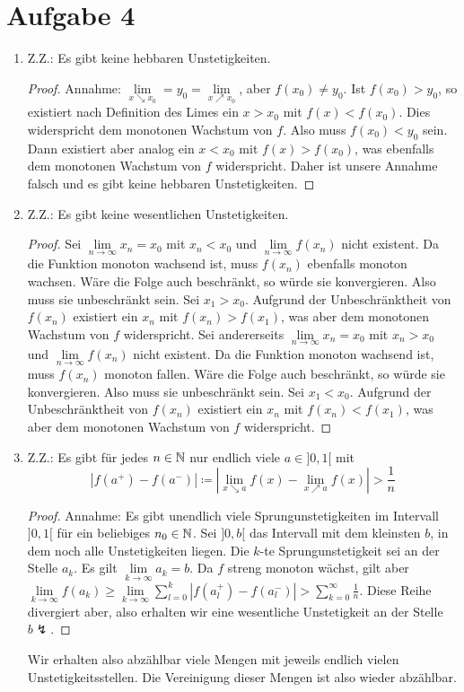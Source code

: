 \documentclass{article}
\newcommand{\mylim}{\lim\limits_{n\to \infty}}
\begin{document}
    \section*{Aufgabe 4}
    \begin{enumerate}
        \item Z.Z.: Es gibt keine hebbaren Unstetigkeiten.
        \begin{proof}
            Annahme: $\lim\limits_{x \searrow x_0} = y_0 = \lim\limits_{x \nearrow x_0}$, aber $f(x_0) \neq y_0$. Ist $f(x_0) > y_0$, so existiert nach Definition des Limes ein $x > x_0$ mit $f(x) < f(x_0)$. Dies widerspricht dem monotonen Wachstum von $f$. Also muss $f(x_0) < y_0$ sein. Dann existiert aber analog ein $x < x_0$ mit $f(x) > f(x_0)$, was ebenfalls dem monotonen Wachstum von $f$ widerspricht. Daher ist unsere Annahme falsch und es gibt keine hebbaren Unstetigkeiten.
        \end{proof}
        \item Z.Z.: Es gibt keine wesentlichen Unstetigkeiten.
        \begin{proof}
            Sei $\mylim x_n = x_0$ mit $x_n < x_0$ und $\mylim f(x_n)$ nicht existent. Da die Funktion monoton wachsend ist, muss $f(x_n)$ ebenfalls monoton wachsen. Wäre die Folge auch beschränkt, so würde sie konvergieren. Also muss sie unbeschränkt sein. Sei $x_1 > x_0$. Aufgrund der Unbeschränktheit von $f(x_n)$ existiert ein $x_n$ mit $f(x_n) > f(x_1)$, was aber dem monotonen Wachstum von $f$ widerspricht.
            Sei andererseits $\mylim x_n = x_0$ mit $x_n > x_0$ und $\mylim f(x_n)$ nicht existent. Da die Funktion monoton wachsend ist, muss $f(x_n)$ monoton fallen. Wäre die Folge auch beschränkt, so würde sie konvergieren. Also muss sie unbeschränkt sein. Sei $x_1 < x_0$. Aufgrund der Unbeschränktheit von $f(x_n)$ existiert ein $x_n$ mit $f(x_n) < f(x_1)$, was aber dem monotonen Wachstum von $f$ widerspricht.
        \end{proof}
        \item Z.Z.: Es gibt für jedes $n\in \mathbb{N}$ nur endlich viele $a\in ]0, 1[$ mit
        $$|f(a^+) - f(a^-)| \coloneqq \left|\lim\limits_{x \searrow a}f(x) - \lim\limits_{x \nearrow a}f(x)\right| > \frac{1}{n}$$ 
        \begin{proof}
            Annahme: Es gibt unendlich viele Sprungunstetigkeiten im Intervall $]0,1[$ für ein beliebiges $n_0 \in \mathbb{N}$.
            Sei $]0, b[$ das Intervall mit dem kleinsten $b$, in dem noch alle Unstetigkeiten liegen. Die $k$-te Sprungunstetigkeit sei an der Stelle $a_k$. Es gilt $\lim\limits_{k \to \infty} a_k = b$. Da $f$ streng monoton wächst, gilt aber $\lim\limits_{k \to \infty} f(a_k) \geq \lim\limits_{k\to \infty}\sum_{l=0}^{k} |f(a_l^+) - f(a_l^-)| > \sum_{k = 0}^{\infty} \frac{1}{n}$. Diese Reihe divergiert aber, also erhalten wir eine wesentliche Unstetigkeit an der Stelle $b \lightning$.
        \end{proof}
        Wir erhalten also abzählbar viele Mengen mit jeweils endlich vielen Unstetigkeitsstellen. Die Vereinigung dieser Mengen ist also wieder abzählbar.
    \end{enumerate}
\end{document}
